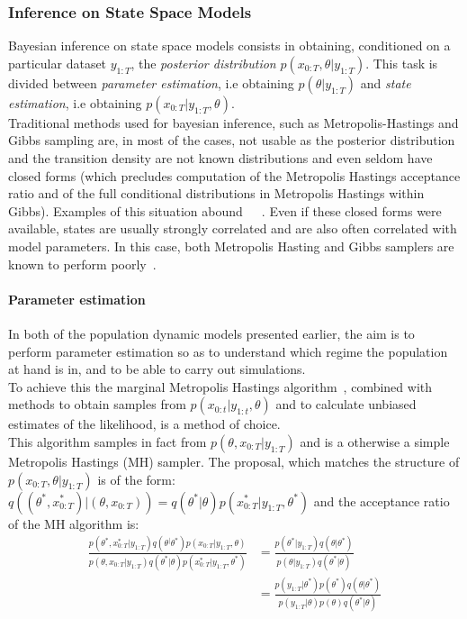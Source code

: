 \documentclass[12pt]{article}
\begin{document}
	\subsubsection{Inference on State Space Models}
	Bayesian inference on state space models consists in obtaining, conditioned on a particular dataset $y_{1:T}$, the \emph{posterior distribution} $p(x_{0:T}, \theta| y_{1:T})$. This task is divided between \emph{parameter estimation}, i.e obtaining $p(\theta | y_{1:T})$  and \emph{state estimation}, i.e obtaining $p(x_{0:T}|y_{1:T}, \theta)$. \\
	Traditional methods used for bayesian inference, such as Metropolis-Hastings and Gibbs sampling are, in most of the cases, not usable as the posterior distribution and the transition density are not known distributions and even seldom have closed forms (which precludes computation of the Metropolis Hastings acceptance ratio and of the full conditional distributions in Metropolis Hastings within Gibbs). Examples of this situation abound~\cite{beskos2006exact}~\cite{fearnhead2008particle}~\cite{murray2011particle}. Even if these closed forms were available, states are usually strongly correlated and are also often correlated with model parameters. In this case, both Metropolis Hasting and Gibbs samplers are known to perform poorly~\cite{van2011partially}. \\

	
	\paragraph{Parameter estimation}
	In both of the population dynamic models presented earlier, the aim is to perform parameter estimation so as to understand which regime the population at hand is in, and to be able to carry out simulations. \\
	To achieve this the marginal Metropolis Hastings algorithm~\cite{hastings1970monte}, combined with methods to obtain samples from  $p(x_{0:t}| y_{1:t}, \theta)$ and to calculate unbiased estimates of the likelihood, is a method of choice. \\
	This algorithm samples in fact from $p(\theta, x_{0:T} | y_{1:T})$ and is a otherwise a simple Metropolis Hastings (MH) sampler. The proposal, which matches the structure of $p(x_{0:T}, \theta | y_{1:T})$ is of the form: $q((\theta^*, x_{0:T}^*) | (\theta, x_{0:T})) = q(\theta^* | \theta)p(x_{0:T}^* | y_{1:T}, \theta^*)$ and the acceptance ratio of the MH algorithm is: 
	\begin{align*}
	\frac{p(\theta^*, x_{0:T}^* | y_{1:T})q(\theta^ | \theta^*)p(x_{0:T} | y_{1:T}, \theta)}{p(\theta, x_{0:T} | y_{1:T})q(\theta^* | \theta)p(x_{0:T}^* | y_{1:T}, \theta^*)} & = \frac{p(\theta^* | y_{1:T})q(\theta | \theta^*)}{p(\theta | y_{1:T})q(\theta^* | \theta)} \\
	& = \frac{p(y_{1:T} | \theta^*)p(\theta^*)q(\theta | \theta^*)}{p(y_{1:T}|\theta)p(\theta)q(\theta^* | \theta)}
	\end{align*}
	
\end{document}
